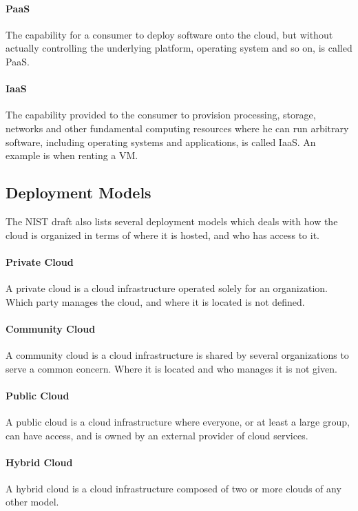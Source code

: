 \documentclass[pdftex,english,10pt,b5paper,twoside]{book}
\begin{document}
\paragraph{\ac{PaaS}} The capability for a consumer to deploy software onto
the cloud, but without actually controlling the underlying platform, operating
system and so on, is called \ac{PaaS}.

\paragraph{\ac{IaaS}} The capability provided to the consumer to provision
processing, storage, networks and other fundamental computing resources where
he can run arbitrary software, including operating systems and applications, is
called \ac{IaaS}. An example is when renting a \ac{VM}.

\subsection{Deployment Models}

The \ac{NIST} draft \cite{cloud_nistdef} also lists several deployment models
which deals with how the cloud is organized in terms of where it is hosted, and
who has access to it.

\paragraph{Private Cloud} A private cloud is a cloud infrastructure operated
solely for an organization. Which party manages the cloud, and where it is
located is not defined.

\paragraph{Community Cloud} A community cloud is a cloud infrastructure is
shared by several organizations to serve a common concern. Where it is located
and who manages it is not given.

\paragraph{Public Cloud} A public cloud is a cloud infrastructure where
everyone, or at least a large group, can have access, and is owned by an external
provider of cloud services.

\paragraph{Hybrid Cloud} A hybrid cloud is a cloud infrastructure composed of
two or more clouds of any other model.
\end{document}
